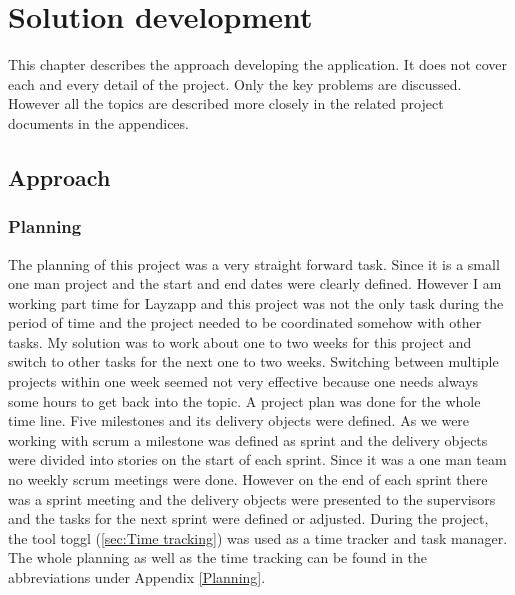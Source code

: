 
\chapter{Solution development} %

\label{Solution development} %



This chapter describes the approach developing the application. It does not cover each and every detail of the project. Only the key problems are discussed. However all the topics are described more closely in the related project documents in the appendices.

\section{Approach}

\subsection{Planning}

The planning of this project was a very straight forward task. Since it is a small one man project and the start and end dates were clearly defined.  However I am working part time for Layzapp and this project was not the only task during the period of time and the project needed to be coordinated somehow with other tasks. My solution was to work about one to two weeks for this project and switch to other tasks for the next one to two weeks. Switching between multiple projects within one week seemed not very effective because one needs always some hours to get back into the topic. \linebreak
A project plan was done for the whole time line. Five milestones and its delivery objects were defined. As we were working with scrum a milestone was defined as sprint and the delivery objects were divided into stories on the start of each sprint. Since it was a one man team no weekly scrum meetings were done. However on the end of each sprint there was a sprint meeting and the delivery objects were presented to the supervisors and the tasks for the next sprint were defined or adjusted. During the project, the tool toggl (\ref{sec:Time tracking}) was used as a time tracker and task manager. The whole planning as well as the time tracking can be found in the abbreviations under Appendix \ref{Planning}.

